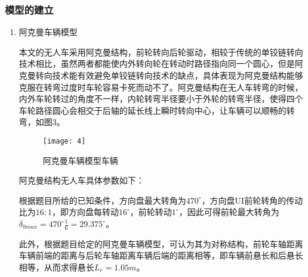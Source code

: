 \documentclass{MathorCupmodeling}
\begin{document}
	\subsubsection{模型的建立}
	\begin{enumerate}
		\item 阿克曼车辆模型 
		
		本文的无人车采用阿克曼结构，前轮转向后轮驱动，相较于传统的单铰链转向技术相比，虽然两者都能使内外转向轮在转动时路径指向同一个圆心，但是阿克曼转向技术能有效避免单铰链转向技术的缺点，具体表现为阿克曼结构能够克服在转弯过度时车轮容易卡死而动不了。阿克曼结构在无人车转弯的时候，内外车轮转过的角度不一样，内轮转弯半径要小于外轮的转弯半径，使得四个车轮路径圆心会相交于后轴的延长线上瞬时转向中心，让车辆可以顺畅的转弯，如图3。
		\begin{figure}[h]
			\centering
			\texttt{[image: 4]}
			\caption{阿克曼车辆模型车辆}
			\label{fig:circuit-diagram}
		\end{figure}
		
		阿克曼结构无人车具体参数如下：
		\begin{table*}[htbp]
			\centering
			\caption{阿克曼结构无人车参数} \label{fig:aa}
			\renewcommand\arraystretch{1.5}{
			}
			
		
		  \end{table*}
	
		  根据题目所给的已知条件，方向盘最大转角为$470^{\circ}$，方向盘UI前轮转角的传动比为$16:1$，即方向盘每转动$16^{\circ}$，前轮转动$1^{\circ}$，因此可得前轮最大转角为$\delta_{0max}=470^{\circ}\frac16=29.375^{\circ}$。
	
	此外，根据题目给定的阿克曼车辆模型，可认为其为对称结构，前轮车轴距离车辆前端的距离与后轮车轴距离车辆后端的距离相等，即车辆前悬长和后悬长相等，从而求得悬长$L_r=1.05m$。
	

	\end{enumerate}

	
\end{document}
